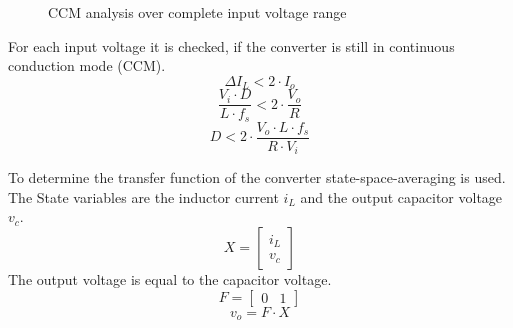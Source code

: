 \documentclass[a4paper,11pt,fleqn]{article}
\begin{document}
\begin{figure}[h!]
    \centering
    \caption{CCM analysis over complete input voltage range}
    \label{fig_ccm}
\end{figure}

For each input voltage it is checked, if the converter is still in continuous 
conduction mode (CCM). 
\[ \Delta I_L < 2 \cdot I_o \]
\[ \dfrac{V_i \cdot D}{L \cdot f_s} < 2 \cdot \dfrac{V_o}{R} \]
\[ D < 2 \cdot \dfrac{V_o \cdot L \cdot f_s}{R \cdot V_i} \]

To determine the transfer function of the converter state-space-averaging is used. The State variables are the inductor current $i_L$ and the output capacitor voltage $v_c$. 
\[ X = \left[\begin{array}{c}i_L\\v_c\end{array}\right] \]
The output voltage is equal to the capacitor voltage. 
\[ F = \left[\begin{array}{cc}0 & 1\end{array}\right] \]
\[ v_o = F \cdot X \]
\end{document}
